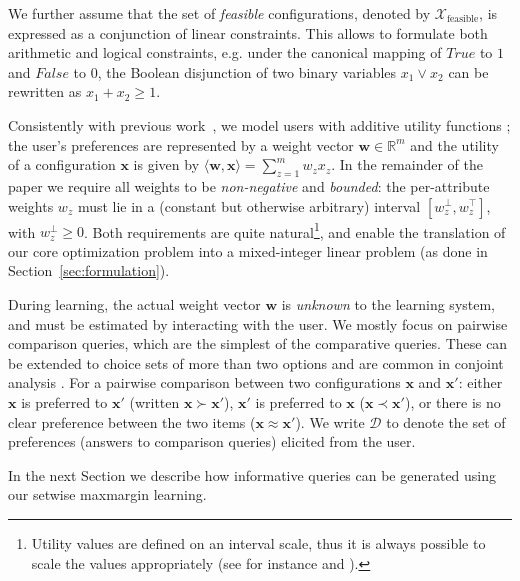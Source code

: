 \documentclass{article}
\renewcommand\[{\begin{equation}}
\renewcommand\]{\end{equation}}
\newcommand{\bbR}{\mathbb{R}}
\newcommand{\calvar}[1]{\ensuremath{\mathcal{#1}}}
\newcommand{\calD}{\calvar{D}}
\newcommand{\calX}{\calvar{X}}
\newcommand{\vecvar}[1]{\ensuremath{\boldsymbol{#1}}}
\newcommand{\vw}{\vecvar{w}}
\newcommand{\vx}{\vecvar{x}}
\begin{document}
We further assume that the set of {\em feasible} configurations, denoted by
$\calX_\text{feasible}$, is expressed as
a conjunction of linear constraints. This allows to formulate both arithmetic
and logical constraints,
e.g. under the canonical mapping of $True$ to $1$ and $False$ to $0$, the
Boolean disjunction of two binary variables $x_1 \lor x_2$ can be rewritten as
$x_1 + x_2 \ge 1$.

Consistently with previous work~\cite{guo2010real,viappiani2010optimal}, 
we model users with additive utility functions \cite{keeney1976}; 
the user's preferences are represented by a  weight
vector $\vw\in\bbR^m$ and
the utility of a configuration $\vx$ is given by
$\langle \vw, \vx \rangle = \sum_{z=1}^m w_z x_z$. 
In the remainder of the paper we
require all weights to be {\em non-negative} and {\em bounded}: the per-attribute
weights $w_z$ must lie in a (constant but otherwise arbitrary) interval
$[w^\bot_z, w^\top_z]$, with $w^\bot_z \ge 0$. 
Both requirements are quite natural\footnote{Utility values are defined on an
interval scale, thus it is always possible to scale the values appropriately (see for instance \cite{Torra2007} and \cite{keeney1976}).}, and enable the translation of our core optimization problem into a
mixed-integer linear problem (as done in Section~\ref{sec:formulation}). 

During learning, the actual weight vector $\vw$ is {\em unknown} to
the learning system, and must be estimated by interacting with the
user. We mostly focus on pairwise comparison queries, which are the
simplest of the comparative queries. These can be extended to choice
sets of more than two options
\cite{viappiani2009,viappiani2010optimal} and are common in conjoint analysis
\cite{louviere2000,toubia2004}. %
For a pairwise comparison between two configurations $\vx$ and $\vx'$:
either $\vx$ is preferred to $\vx'$ (written $\vx \succ \vx'$), $\vx'$
is preferred to $\vx$ ($\vx \prec \vx'$), or there is no clear
preference between the two items ($\vx \approx \vx'$). We write
$\calD$ to denote the set of preferences (answers to comparison
queries) elicited from the user. 

In the next Section we describe how informative queries can be generated
using our setwise maxmargin learning.
\end{document}
